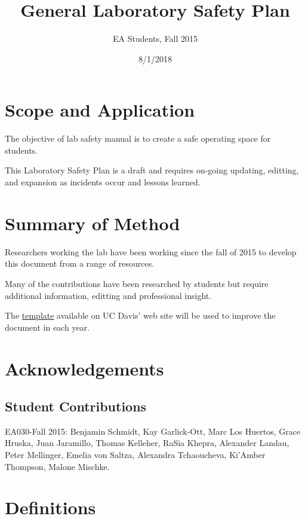 \documentclass[12pt]{../SOP4_alpha}\usepackage[]{graphicx}\usepackage[]{color}
\title{General Laboratory Safety Plan}
\date{8/1/2018}
\author{EA Students, Fall 2015}
\begin{document}
\maketitle


\section{Scope and Application}

\NP The objective of lab safety manual is to create a safe operating space for students.

\NP This Laboratory Safety Plan is a draft and requires on-going updating, editting, and expansion as incidents occur and lessons learned. 


\section{Summary of Method}

\NP Researchers working the lab have been working since the fall of 2015 to develop this document from a range of resources. 

\NP Many of the contributions have been researched by students but require additional information, editting and professional insight.

\NP The \href{http://safetyservices.ucdavis.edu/sites/default/files/documents/LabSafetyPlan_Template.docx}{template} available on UC Davis' web site will be used to improve the document in each year.

\newpage
\tableofcontents

\section{Acknowledgements}

\subsection*{Student Contributions}

\NP EA030-Fall 2015: Benjamin Schmidt, Kay Garlick-Ott, Marc Los Huertos, Grace Hruska, Juan Jaramillo, Thomas Kelleher, RaSia Khepra, Alexander Landau, Peter Mellinger, Emelia von Saltza, Alexandra Tchaoucheva, Ki'Amber Thompson, Malone Mischke.


\section{Definitions}
\end{document}
